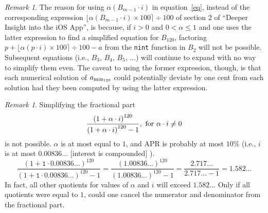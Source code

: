 \documentclass[12pt,letterpaper,oneside]{article}
\theoremstyle{remark} %
\newtheorem{remark}[theorem]{Remark}
\begin{document}
	\newpage
	\begin{remark}
	The reason for using $\alpha\left(B_{m-1}\cdot i\right)$ in equation~\ref{eq}, instead of the corresponding expression $\big\lfloor{\alpha\left(B_{m-1}\cdot i\right)\times 100}\big\rceil\div 100$ of section 2 of ``Deeper Insight into the iOS App'', is because, if $i>0$ and $0<\alpha\leq1$ and one uses the latter expression to find a simplified equation for $B_{120}$, factoring $p+\big\lfloor{\alpha\left(p\cdot i\right)\times 100}\big\rceil\div 100-a$ from the \texttt{nint} function in $B_{2}$ will not be possible. Subsequent equations (i.e., $B_{3}$, $B_{4}$, $B_{5}$, $\dots$) will continue to expand with no way to simplify them even. The caveat to using the former expression, though, is that each numerical solution of $a_{\rm{min_{120}}}$ could potentially deviate by one cent from each solution had they been computed by using the latter expression.
	\end{remark}	

	\vspace{12pt}
	\begin{remark}
	Simplifying the fractional part
	$$\frac{\left(1+\alpha\cdot i\right)^{120}}{\left(1+\alpha\cdot i\right)^{120}-1},\mbox{ for }\alpha\cdot i\neq 0$$
	is not possible. $\alpha$ is at most equal to $1$, and $\mbox{APR}$ is probably at most $10\%$ (i.e., $i$ is at most $0.00836...$ [interest is compounded] ).
	$$\frac{\left(1+\mathtt{1}\cdot\mathtt{0.00836...}\right)^{120}}{\left(1+\mathtt{1}\cdot\mathtt{0.00836...}\right)^{120}-1}=\frac{\left(\mathtt{1.00836...}\right)^{120}}{\left(\mathtt{1.00836...}\right)^{120}-1}=\frac{\mathtt{2.717...}}{\mathtt{2.717...}-1}=\mathtt{1.582...}$$
	In fact, all other quotients for values of $\alpha$ and $i$ will exceed $1.582...$ Only if all quotients were equal to $1$, could one cancel the numerator and denominator from the fractional part.
	\end{remark}
\end{document}
